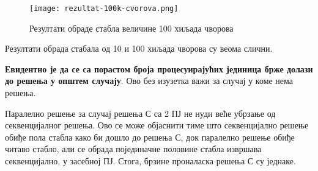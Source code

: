 \begin{figure}[]
    \centering
    \texttt{[image: rezultat-100k-cvorova.png]}
    \caption{Резултати обраде стабла величине 100 хиљада чворова}
    \label{fig:rez100k}
\end{figure}

Резултати обрада стабала од 10 и 100 хиљада чворова су веома слични.

\textbf{Евидентно је да се са порастом броја процесуирајућих јединица брже долази до решења у општем случају}.
Ово без изузетка важи за случај у коме нема решења.

Паралелно решење за случај решења С са 2 ПЈ не нуди веће убрзање од секвенцијалног решења.
Ово се може објаснити тиме што секвенцијално решење обиђе пола стабла како би дошло до решења С,
док паралелно решење обиђе читаво стабло, али се обрада појединачне половине стабла извршава секвенцијално, у засебној ПЈ.
Стога, брзине проналаска решења С су једнаке.


\pagebreak